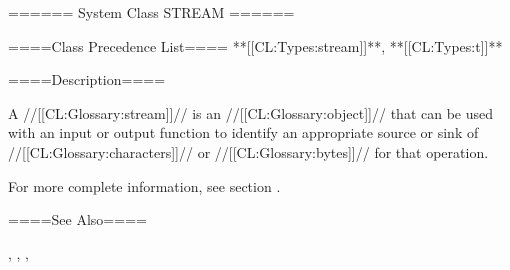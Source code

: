 ====== System Class STREAM ======

====Class Precedence List==== **[[CL:Types:stream]]**, **[[CL:Types:t]]**

====Description====

A //[[CL:Glossary:stream]]// is an //[[CL:Glossary:object]]// that can be used with an input or output function to identify an appropriate source or sink of //[[CL:Glossary:characters]]// or //[[CL:Glossary:bytes]]// for that operation.

For more complete information, see section {\secref\StreamConcepts}.

====See Also====

{\secref\StreamConcepts}, {\secref\PrintingOtherObjects}, {\chapref\Printer}, {\chapref\Reader}


